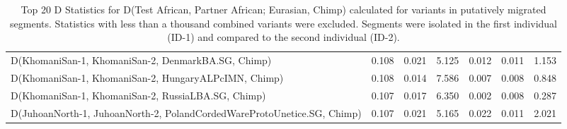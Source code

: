 \begin{table}[ht]
\begin{tabular}{lrrrrrr}
  D(KhomaniSan-1, KhomaniSan-2, DenmarkBA.SG, Chimp) & 0.108 & 0.021 & 5.125 & 0.012 & 0.011 & 1.153 \\ 
  D(KhomaniSan-1, KhomaniSan-2, HungaryALPcIMN, Chimp) & 0.108 & 0.014 & 7.586 & 0.007 & 0.008 & 0.848 \\ 
  D(KhomaniSan-1, KhomaniSan-2, RussiaLBA.SG, Chimp) & 0.107 & 0.017 & 6.350 & 0.002 & 0.008 & 0.287 \\ 
  D(JuhoanNorth-1, JuhoanNorth-2, PolandCordedWareProtoUnetice.SG, Chimp) & 0.107 & 0.021 & 5.165 & 0.022 & 0.011 & 2.021 \\ 
   \hline
\end{tabular}
\caption{Top 20 D Statistics for D(Test African, Partner African; Eurasian, Chimp) calculated for variants in putatively migrated segments. Statistics with less than a thousand combined variants were excluded. Segments were isolated in the first individual (ID-1) and compared to the second individual (ID-2).} 
\label{table:dstats_summary}
\end{table}
